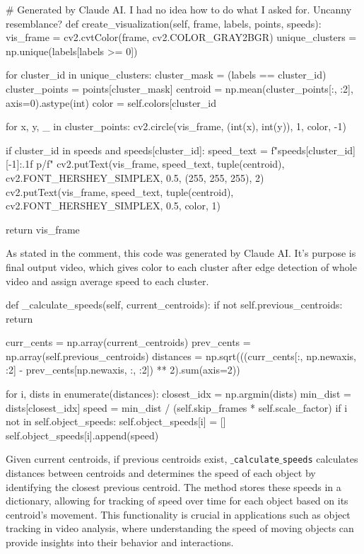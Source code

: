 \documentclass{article}
\begin{document}
	\newpage
	\begin{python}
# Generated by Claude AI. I had no idea how to do what I asked for. Uncanny resemblance?
def create_visualization(self, frame, labels, points, speeds):
	vis_frame = cv2.cvtColor(frame, cv2.COLOR_GRAY2BGR)
	unique_clusters = np.unique(labels[labels >= 0])
	
	for cluster_id in unique_clusters:
		cluster_mask = (labels == cluster_id)
		cluster_points = points[cluster_mask]
		centroid = np.mean(cluster_points[:, :2], axis=0).astype(int)
		color = self.colors[cluster_id %
		
		for x, y, _ in cluster_points:
			cv2.circle(vis_frame, (int(x), int(y)), 1, color, -1)
		
		if cluster_id in speeds and speeds[cluster_id]:
			speed_text = f"{speeds[cluster_id][-1]:.1f} p/f"
			cv2.putText(vis_frame, speed_text, tuple(centroid),
					cv2.FONT_HERSHEY_SIMPLEX, 0.5, (255, 255, 255), 2)
			cv2.putText(vis_frame, speed_text, tuple(centroid),
					cv2.FONT_HERSHEY_SIMPLEX, 0.5, color, 1)
	
	return vis_frame\end{python}

	As stated in the comment, this code was generated by Claude AI. It's purpose is final output video, which gives color to each cluster after edge detection of whole video and assign average speed to each cluster.
	
	\begin{python}
def _calculate_speeds(self, current_centroids):
	if not self.previous_centroids:
		return
	
	curr_cents = np.array(current_centroids)
	prev_cents = np.array(self.previous_centroids)
	distances = np.sqrt(((curr_cents[:, np.newaxis, :2]
								- prev_cents[np.newaxis, :, :2]) ** 2).sum(axis=2))
	
	for i, dists in enumerate(distances):
		closest_idx = np.argmin(dists)
		min_dist = dists[closest_idx]
		speed = min_dist / (self.skip_frames * self.scale_factor)
		if i not in self.object_speeds:
			self.object_speeds[i] = []
		self.object_speeds[i].append(speed)\end{python}
	
	Given current centroids, if previous centroids exist, \texttt{$\_$calculate$\_$speeds} calculates distances between centroids  and determines the speed of each object by identifying the closest previous centroid. The method stores these speeds in a dictionary, allowing for tracking of speed over time for each object based on its centroid's movement. This functionality is crucial in applications such as object tracking in video analysis, where understanding the speed of moving objects can provide insights into their behavior and interactions.
	
\end{document}
